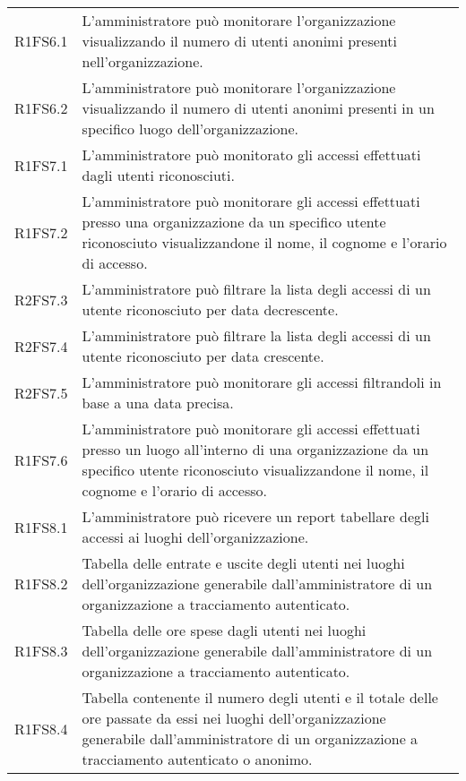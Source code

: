 {\begin{longtable}{ >{\centering}p{} >{}p{}}
R1FS6.1 & L'amministratore può monitorare l'organizzazione visualizzando il numero di utenti anonimi presenti nell'organizzazione. \\

R1FS6.2 & L'amministratore può monitorare l'organizzazione visualizzando il numero di utenti anonimi presenti in un specifico luogo dell'organizzazione. \\

R1FS7.1 & L'amministratore può monitorato gli accessi effettuati dagli utenti riconosciuti. \\

R1FS7.2 & L'amministratore può monitorare gli accessi effettuati presso una organizzazione da un specifico utente riconosciuto visualizzandone il nome, il cognome e l'orario di accesso. \\

R2FS7.3 & L’amministratore può filtrare la lista degli accessi di un utente riconosciuto per data decrescente. \\

R2FS7.4 & L’amministratore può filtrare la lista degli accessi di un utente riconosciuto per data crescente. \\

R2FS7.5 & L'amministratore può monitorare gli accessi filtrandoli in base a una data precisa. \\

R1FS7.6 & L'amministratore può monitorare gli accessi effettuati presso un luogo all'interno di una organizzazione da un specifico utente riconosciuto visualizzandone il nome, il cognome e l'orario di accesso. \\

R1FS8.1 & L'amministratore può ricevere un report tabellare degli accessi ai luoghi dell'organizzazione. \\

R1FS8.2 &  Tabella delle entrate e uscite degli utenti nei luoghi dell'organizzazione generabile dall'amministratore di un organizzazione a tracciamento autenticato. \\

R1FS8.3 & Tabella delle ore spese dagli utenti nei luoghi dell'organizzazione generabile dall'amministratore di un organizzazione a tracciamento autenticato. \\

R1FS8.4 & Tabella contenente il numero degli utenti e il totale delle ore passate da essi nei luoghi dell'organizzazione generabile dall'amministratore di un organizzazione a tracciamento autenticato o anonimo. \\


\end{longtable}}
